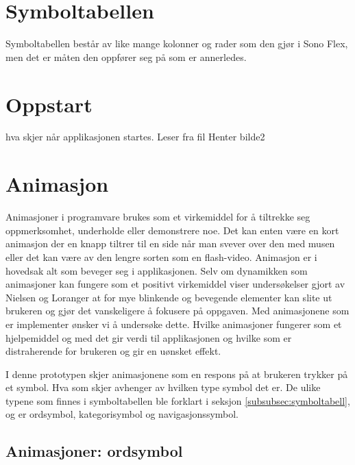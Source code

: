 { 
 
\section{Symboltabellen} 
 
 
Symboltabellen består av like mange kolonner og rader som den gjør i Sono Flex,  men det er måten den oppfører seg på som er annerledes.   
 
 
 
\section{Oppstart} 
hva skjer når applikasjonen startes. 
Leser fra fil 
Henter bilde2 
 
 
 
 
 
 
\section{Animasjon} 
 
 
Animasjoner i programvare brukes som et virkemiddel for å tiltrekke seg oppmerksomhet, underholde eller demonstrere noe. Det kan enten være en kort animasjon der en knapp tiltrer til en side når man svever over den med musen eller det kan være av den lengre sorten som en flash-video.  Animasjon er i hovedsak alt som beveger seg i applikasjonen. Selv om dynamikken som animasjoner kan fungere som et positivt virkemiddel viser undersøkelser gjort av Nielsen og Loranger \cite{NielsenBok}  at for mye blinkende og bevegende elementer kan slite ut brukeren og gjør det vanskeligere å fokusere på oppgaven. Med animasjonene som er implementer ønsker vi å undersøke dette. Hvilke animasjoner fungerer som et hjelpemiddel og med det gir verdi til applikasjonen og hvilke som er distraherende for brukeren og gir en uønsket effekt. 
 
 
I denne prototypen skjer animasjonene som en respons på at brukeren trykker på et symbol. Hva som skjer avhenger av hvilken type symbol det er. De ulike typene som finnes i symboltabellen ble forklart i seksjon \ref{subsubsec:symboltabell}, og er ordsymbol, kategorisymbol og navigasjonssymbol. 
 
 
 
 
\subsection{Animasjoner: ordsymbol} 
 
}

